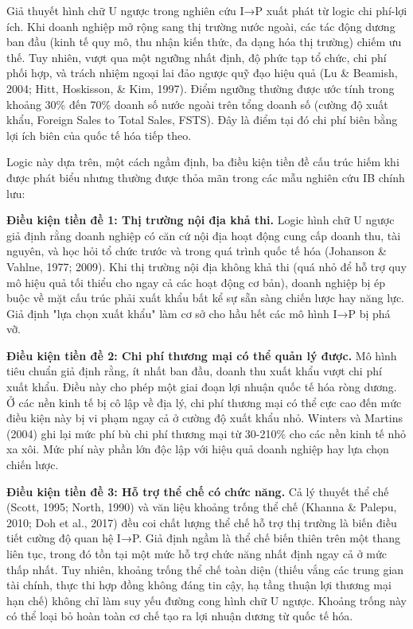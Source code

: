 \documentclass[12pt,a4paper]{article}
\begin{document}
Giả thuyết hình chữ U ngược trong nghiên cứu I→P xuất phát từ logic chi
phí-lợi ích. Khi doanh nghiệp mở rộng sang thị trường nước ngoài, các
tác động dương ban đầu (kinh tế quy mô, thu nhận kiến thức, đa dạng hóa
thị trường) chiếm ưu thế. Tuy nhiên, vượt qua một ngưỡng nhất định, độ
phức tạp tổ chức, chi phí phối hợp, và trách nhiệm ngoại lai đảo ngược
quỹ đạo hiệu quả (Lu \& Beamish, 2004; Hitt, Hoskisson, \& Kim, 1997).
Điểm ngưỡng thường được ước tính trong khoảng 30\% đến 70\% doanh số
nước ngoài trên tổng doanh số (cường độ xuất khẩu, Foreign Sales to
Total Sales, FSTS). Đây là điểm tại đó chi phí biên bằng lợi ích biên
của quốc tế hóa tiếp theo.

Logic này dựa trên, một cách ngầm định, ba điều kiện tiền đề cấu trúc
hiếm khi được phát biểu nhưng thường được thỏa mãn trong các mẫu nghiên
cứu IB chính lưu:

\textbf{Điều kiện tiền đề 1: Thị trường nội địa khả thi.} Logic hình chữ
U ngược giả định rằng doanh nghiệp có căn cứ nội địa hoạt động cung cấp
doanh thu, tài nguyên, và học hỏi tổ chức trước và trong quá trình quốc
tế hóa (Johanson \& Vahlne, 1977; 2009). Khi thị trường nội địa không
khả thi (quá nhỏ để hỗ trợ quy mô hiệu quả tối thiểu cho ngay cả các
hoạt động cơ bản), doanh nghiệp bị ép buộc về mặt cấu trúc phải xuất
khẩu bất kể sự sẵn sàng chiến lược hay năng lực. Giả định "lựa chọn xuất
khẩu" làm cơ sở cho hầu hết các mô hình I→P bị phá vỡ.

\textbf{Điều kiện tiền đề 2: Chi phí thương mại có thể quản lý được.} Mô
hình tiêu chuẩn giả định rằng, ít nhất ban đầu, doanh thu xuất khẩu vượt
chi phí xuất khẩu. Điều này cho phép một giai đoạn lợi nhuận quốc tế hóa
ròng dương. Ở các nền kinh tế bị cô lập về địa lý, chi phí thương mại có
thể cực cao đến mức điều kiện này bị vi phạm ngay cả ở cường độ xuất
khẩu nhỏ. Winters và Martins (2004) ghi lại mức phí bù chi phí thương
mại từ 30-210\% cho các nền kinh tế nhỏ xa xôi. Mức phí này phần lớn độc
lập với hiệu quả doanh nghiệp hay lựa chọn chiến lược.

\textbf{Điều kiện tiền đề 3: Hỗ trợ thể chế có chức năng.} Cả lý thuyết
thể chế (Scott, 1995; North, 1990) và văn liệu khoảng trống thể chế
(Khanna \& Palepu, 2010; Doh et al., 2017) đều coi chất lượng thể chế hỗ
trợ thị trường là biến điều tiết cường độ quan hệ I→P. Giả định ngầm là
thể chế biến thiên trên một thang liên tục, trong đó tồn tại một mức hỗ
trợ chức năng nhất định ngay cả ở mức thấp nhất. Tuy nhiên, khoảng trống
thể chế toàn diện (thiếu vắng các trung gian tài chính, thực thi hợp
đồng không đáng tin cậy, hạ tầng thuận lợi thương mại hạn chế) không chỉ
làm suy yếu đường cong hình chữ U ngược. Khoảng trống này có thể loại bỏ
hoàn toàn cơ chế tạo ra lợi nhuận dương từ quốc tế hóa.
\end{document}
